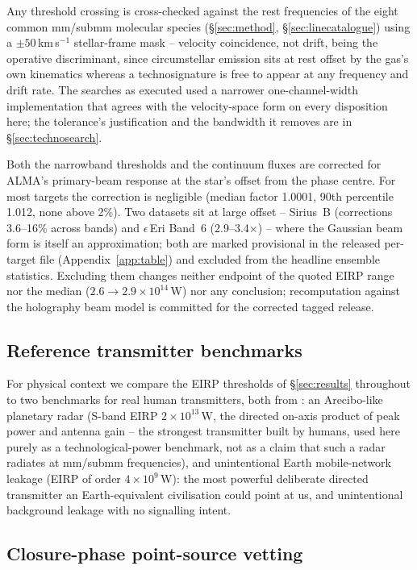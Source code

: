 \documentclass{openjournal}
\begin{document}
Any threshold crossing is cross-checked against the rest frequencies
of the eight common mm/submm molecular species (\S\ref{sec:method},
\S\ref{sec:linecatalogue}) using a $\pm50$\,km\,s$^{-1}$
stellar-frame mask -- velocity coincidence, not drift, being the
operative discriminant, since circumstellar emission sits at rest
offset by the gas's own kinematics whereas a technosignature is free
to appear at any frequency and drift rate. The searches as executed
used a narrower one-channel-width implementation that agrees with the
velocity-space form on every disposition here; the tolerance's
justification and the bandwidth it removes are in
\S\ref{sec:technosearch}.

Both the narrowband thresholds and the continuum fluxes are corrected
for ALMA's primary-beam response at the star's offset from the phase
centre. For most targets the correction is negligible (median factor
1.0001, 90th percentile 1.012, none above 2\%). Two datasets sit at
large offset -- Sirius~B (corrections 3.6--16\% across bands) and
$\epsilon$\,Eri Band~6 (2.9--3.4$\times$) -- where the Gaussian beam
form is itself an approximation; both are marked provisional in
the released per-target file (Appendix~\ref{app:table}) and excluded from the headline ensemble
statistics. Excluding them changes neither endpoint of the quoted
EIRP range nor the median ($2.6\to2.9\times10^{14}$\,W) nor any
conclusion; recomputation against the holography beam model is
committed for the corrected tagged release.
\subsection{Reference transmitter benchmarks}
\label{sec:benchmarks}

For physical context we compare the EIRP thresholds of
\S\ref{sec:results} throughout to two benchmarks for real human
transmitters, both from \citet{EarthDetectingEarth2025}: an
Arecibo-like planetary radar (S-band EIRP $2\times10^{13}$\,W, the
directed on-axis product of peak power and antenna gain -- the
strongest transmitter built by humans, used here purely as a
technological-power benchmark, not as a claim that such a radar
radiates at mm/submm frequencies), and unintentional Earth
mobile-network leakage (EIRP of order $4\times10^{9}$\,W): the most
powerful deliberate directed transmitter an Earth-equivalent
civilisation could point at us, and unintentional background leakage
with no signalling intent.

\subsection{Closure-phase point-source vetting}
\label{sec:closurephase}
\end{document}
